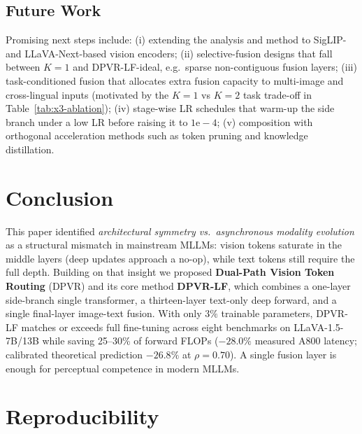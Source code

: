 \documentclass[a4paper,fleqn,review]{cas-sc}
\newcommand{\dpvr}{DPVR}
\newcommand{\dpvrlf}{DPVR-LF}
\newcommand{\dpvrlfideal}{DPVR-LF-ideal}
\begin{document}
\subsection{Future Work}

Promising next steps include: (i) extending the analysis and method
to SigLIP- and LLaVA-Next-based vision encoders;
(ii) selective-fusion designs that fall between $K = 1$ and
\dpvrlfideal{}, e.g.\ sparse non-contiguous fusion layers;
(iii) task-conditioned fusion that allocates extra fusion capacity
to multi-image and cross-lingual inputs (motivated by the
$K = 1$ vs $K = 2$ task trade-off in Table~\ref{tab:x3-ablation});
(iv) stage-wise LR schedules that warm-up the side branch under a
low LR before raising it to $1\mathrm{e}{-}4$;
(v) composition with orthogonal acceleration methods such as token
pruning and knowledge distillation.

\section{Conclusion}\label{sec:conclusion}

This paper identified \emph{architectural symmetry vs.\ asynchronous
modality evolution} as a structural mismatch in mainstream MLLMs:
vision tokens saturate in the middle layers (deep updates approach
a no-op), while text tokens still require the full depth. Building
on that insight we proposed \textbf{Dual-Path Vision Token Routing}
(\dpvr{}) and its core method \textbf{\dpvrlf{}}, which combines a
one-layer side-branch single transformer, a thirteen-layer text-only
deep forward, and a single final-layer image-text fusion. With only
$3\%$ trainable parameters, \dpvrlf{} matches or exceeds full
fine-tuning across eight benchmarks on LLaVA-1.5-7B/13B while saving
25--30\% of forward FLOPs ($-28.0\%$ measured A800 latency;
calibrated theoretical prediction $-26.8\%$ at $\rho = 0.70$).
A single fusion layer is enough for perceptual competence in modern
MLLMs.

\section*{Reproducibility}
\end{document}
